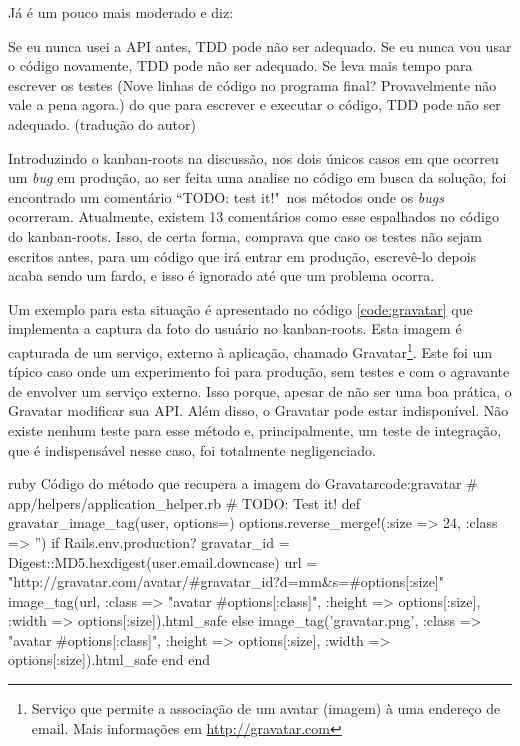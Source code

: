 Já  é um pouco mais moderado e diz:

\begin{citacao}
Se eu nunca usei a API antes, TDD pode não ser adequado. Se eu nunca vou usar o código novamente, TDD pode não ser adequado. Se leva mais tempo para escrever os testes (Nove linhas de código no programa final? Provavelmente não vale a pena agora.) do que para escrever e executar o código, TDD pode não ser adequado. (tradução do autor)
\end{citacao}

Introduzindo o kanban-roots na discussão, nos dois únicos casos em que ocorreu um \textit{bug} em produção, ao ser feita uma analise no código em busca da solução, foi encontrado um comentário ``TODO: test it!"\ nos métodos onde os \textit{bugs} ocorreram. Atualmente, existem 13 comentários como esse espalhados no código do kanban-roots. Isso, de certa forma, comprava que caso os testes não sejam escritos antes, para um código que irá entrar em produção, escrevê-lo depois acaba sendo um fardo, e isso é ignorado até que um problema ocorra.

Um exemplo para esta situação é apresentado no código \ref{code:gravatar} que implementa a captura da foto do usuário no kanban-roots. Esta imagem é capturada de um serviço, externo à aplicação, chamado Gravatar\footnote{Serviço que permite a associação de um avatar (imagem) à uma endereço de email. Mais informações em \url{http://gravatar.com}}. Este foi um típico caso onde um experimento foi para produção, sem testes e com o agravante de envolver um serviço externo. Isso porque, apesar de não ser uma boa prática, o Gravatar modificar sua API. Além disso, o Gravatar pode estar indisponível. Não existe nenhum teste para esse método e, principalmente, um teste de integração, que é indispensável nesse caso, foi totalmente negligenciado.

\begin{mycode}{ruby}%
{Código do método que recupera a imagem do Gravatar}{code:gravatar}
# app/helpers/application_helper.rb
# TODO: Test it!
def gravatar_image_tag(user, options={})
  options.reverse_merge!(:size => 24, :class => '')
  if Rails.env.production?
    gravatar_id = Digest::MD5.hexdigest(user.email.downcase)
    url = "http://gravatar.com/avatar/#{gravatar_id}?d=mm&s=#{options[:size]}"
    image_tag(url,
              :class => "avatar #{options[:class]}",
              :height => options[:size],
              :width => options[:size]).html_safe
  else
    image_tag('gravatar.png',
              :class => "avatar #{options[:class]}",
              :height => options[:size],
              :width => options[:size]).html_safe
  end
end
\end{mycode}

